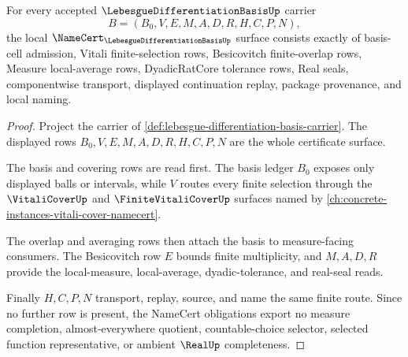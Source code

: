 \begin{theorem}
\label{thm:lebesgue-differentiation-basis-namecert-obligations}
For every accepted $\LebesgueDifferentiationBasisUp$ carrier
$$
B=(B_0,V,E,M,A,D,R,H,C,P,N),
$$
the local $\NameCert_{\LebesgueDifferentiationBasisUp}$ surface consists exactly of basis-cell admission, Vitali finite-selection rows, Besicovitch finite-overlap rows, Measure local-average rows, DyadicRatCore tolerance rows, Real seals, componentwise transport, displayed continuation replay, package provenance, and local naming.
\end{theorem}
\begin{proof}
Project the carrier of \autoref{def:lebesgue-differentiation-basis-carrier}. The displayed rows $B_0,V,E,M,A,D,R,H,C,P,N$ are the whole certificate surface.

The basis and covering rows are read first. The basis ledger $B_0$ exposes only displayed balls or intervals, while $V$ routes every finite selection through the $\VitaliCoverUp$ and $\FiniteVitaliCoverUp$ surfaces named by \autoref{ch:concrete-instances-vitali-cover-namecert}.

The overlap and averaging rows then attach the basis to measure-facing consumers. The Besicovitch row $E$ bounds finite multiplicity, and $M,A,D,R$ provide the local-measure, local-average, dyadic-tolerance, and real-seal reads.

Finally $H,C,P,N$ transport, replay, source, and name the same finite route. Since no further row is present, the NameCert obligations export no measure completion, almost-everywhere quotient, countable-choice selector, selected function representative, or ambient $\RealUp$ completeness.
\end{proof}


